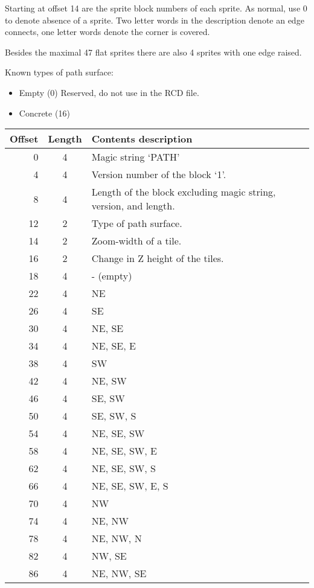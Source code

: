 \documentclass{article}
\begin{document}
Starting at offset 14 are the sprite block numbers of each sprite. As normal,
use 0 to denote absence of a sprite. Two letter words in the description
denote an edge connects, one letter words denote the corner is covered.

Besides the maximal 47 flat sprites there are also 4 sprites with one edge raised.

\medskip
\noindent
Known types of path surface:
\begin{itemize}
\item Empty (0) Reserved, do not use in the RCD{} file.
\item Concrete (16)
\end{itemize}

\begin{center}
\begin{tabular}{|r|c|l|} \hline
\textbf{Offset} & \textbf{Length} & \textbf{Contents description} \\ \hline
   0 &  4 & Magic string `PATH' \\
   4 &  4 & Version number of the block `1'. \\
   8 &  4 & Length of the block excluding magic string, version, and length. \\
  12 &  2 & Type of path surface. \\
  14 &  2 & Zoom-width of a tile. \\
  16 &  2 & Change in Z height of the tiles. \\
  18 &  4 & - (empty) \\
  22 &  4 & NE \\
  26 &  4 & SE \\
  30 &  4 & NE, SE \\
  34 &  4 & NE, SE, E \\
  38 &  4 & SW \\
  42 &  4 & NE, SW \\
  46 &  4 & SE, SW \\
  50 &  4 & SE, SW, S \\
  54 &  4 & NE, SE, SW \\
  58 &  4 & NE, SE, SW, E \\
  62 &  4 & NE, SE, SW, S \\
  66 &  4 & NE, SE, SW, E, S \\
  70 &  4 & NW \\
  74 &  4 & NE, NW \\
  78 &  4 & NE, NW, N \\
  82 &  4 & NW, SE \\
  86 &  4 & NE, NW, SE \\

\end{tabular}
\end{center}
\end{document}
